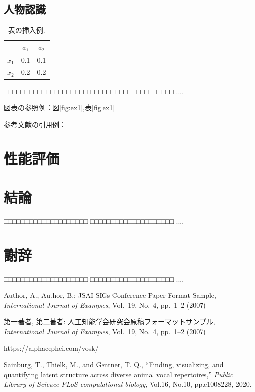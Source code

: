 \documentclass[a4j]{jarticle}
\begin{document}
\subsection{人物認識}


\begin{table}[h]
  \centering
  \caption {表の挿入例.}
  \label{table:ex1}
  \begin{tabular}{c|cc}
    \hline
           & $a_1$ & $a_2$ \\ \hline
    $x_1$  &  0.1  &  0.1  \\
    $x_2$  &  0.2  &  0.2  \\ \hline
  \end{tabular}
\end{table}
%
□□□□□□□□□□□□□□□□□□□□
□□□□□□□□□□□□□□□□□□□□
....

図表の参照例：図\ref{fig:ex1},表\ref{fig:ex1}

参考文献の引用例：\cite{Sample1}\cite{Sample2}


\section{性能評価}


\section{結論}
□□□□□□□□□□□□□□□□□□□□
□□□□□□□□□□□□□□□□□□□□
....


\section*{謝辞}

□□□□□□□□□□□□□□□□□□□□
□□□□□□□□□□□□□□□□□□□□
....


\begin{thebibliography}{99}

Author, A., Author, B.:
JSAI SIGs Conference Paper Format Sample,
{\it International Journal of Examples}, Vol.~19, No.~4, pp.~1--2 (2007)

第一著者, 第二著者:
人工知能学会研究会原稿フォーマットサンプル,
{\it International Journal of Examples}, Vol.~19, No.~4, pp.~1--2 (2007)

https://alphacephei.com/vosk/


Sainburg, T., Thielk, M., and Gentner, T. Q.,
“Finding, visualizing, and quantifying latent structure across diverse animal vocal repertoires,”
{\it Public Library of Science PLoS computational biology},
Vol.16,
No.10,
pp.e1008228,
2020.

\end{thebibliography}
\end{document}
